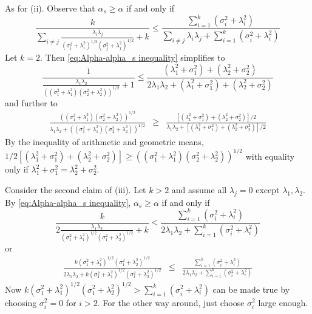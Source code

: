 \documentclass{article}
\makeatletter
\theoremstyle{plain}
\theoremstyle{plain}
\theoremstyle{definition}
\theoremstyle{remark}
\theoremstyle{definition}
\theoremstyle{plain}
\theoremstyle{plain}
\theoremstyle{definition}
\newenvironment{proof}[1][\protect\proofname]{\par
	\normalfont\topsep6\p@\@plus6\p@\relax
	\trivlist
	\itemindent\parindent
	\item[\hskip\labelsep\scshape #1]\ignorespaces
}{%
	\endtrivlist\@endpefalse
}
\providecommand{\proofname}{Proof}
\renewcommand{\sqrt}[1]{{(#1)^{1/2}}}
\makeatother
\begin{document}
\begin{proof}[Proof of Proposition \ref{prop:Reliabilities.}]
As for (ii). Observe that $\alpha_{s}\geq\alpha$
if and only if
\begin{equation}
\label{eq:Alpha-alpha_s inequality}
\frac{k}{\sum_{i\neq j}\frac{\lambda_{i}\lambda_{j}}{\sqrt{\sigma_{i}^{2}+\lambda_{i}^{2}}\sqrt{\sigma_{j}^{2}+\lambda_{j}^{2}}}+k}\leq\frac{\sum_{i=1}^{k}\left(\sigma_{i}^{2}+\lambda_{i}^{2}\right)}{\sum_{i\neq j}\lambda_{i}\lambda_{j}+\sum_{i=1}^{k}\left(\sigma_{i}^{2}+\lambda_{i}^{2}\right)}
\end{equation}
Let $k=2$. Then \eqref{eq:Alpha-alpha_s inequality} simplifies to
\[
\frac{1}{\frac{\lambda_{1}\lambda_{2}}{\sqrt{\left(\sigma_{1}^{2}+\lambda_{1}^{2}\right)\left(\sigma_{2}^{2}+\lambda_{2}^{2}\right)}}+1}\leq\frac{\left(\lambda_{1}^{2}+\sigma_{1}^{2}\right)+\left(\lambda_{2}^{2}+\sigma_{2}^{2}\right)}{2\lambda_{1}\lambda_{2}+\left(\lambda_{1}^{2}+\sigma_{1}^{2}\right)+\left(\lambda_{2}^{2}+\sigma_{2}^{2}\right)}
\]
and further to
\begin{eqnarray*}
\frac{\sqrt{\left(\sigma_{1}^{2}+\lambda_{1}^{2}\right)\left(\sigma_{2}^{2}+\lambda_{2}^{2}\right)}}{\lambda_{1}\lambda_{2}+\sqrt{\left(\sigma_{1}^{2}+\lambda_{1}^{2}\right)\left(\sigma_{2}^{2}+\lambda_{2}^{2}\right)}} & \geq & \frac{\left[\left(\lambda_{1}^{2}+\sigma_{1}^{2}\right)+\left(\lambda_{2}^{2}+\sigma_{2}^{2}\right)\right]/2}{\lambda_{1}\lambda_{2}+\left[\left(\lambda_{1}^{2}+\sigma_{1}^{2}\right)+\left(\lambda_{2}^{2}+\sigma_{2}^{2}\right)\right]/2}
\end{eqnarray*}
By the inequality of arithmetic and geometric means, $1/2\left[\left(\lambda_{1}^{2}+\sigma_{1}^{2}\right)+\left(\lambda_{2}^{2}+\sigma_{2}^{2}\right)\right]\geq\sqrt{\left(\sigma_{1}^{2}+\lambda_{1}^{2}\right)\left(\sigma_{2}^{2}+\lambda_{2}^{2}\right)}$
with equality only if $\lambda_{1}^{2}+\sigma_{1}^{2}=\lambda_{2}^{2}+\sigma_{2}^{2}$.

Consider the second claim of (iii). Let $k>2$ and assume all $\lambda_{j}=0$
except $\lambda_{1},\lambda_{2}$. By \eqref{eq:Alpha-alpha_s inequality}, $\alpha_s \geq \alpha$ if and
only if
\[
\frac{k}{2\frac{\lambda_{1}\lambda_{2}}{\sqrt{\sigma_{1}^{2}+\lambda_{1}^{2}}\sqrt{\sigma_{1}^{2}+\lambda_{2}^{2}}}+k}<\frac{\sum_{i=1}^{k}\left(\sigma_{i}^{2}+\lambda_{i}^{2}\right)}{2\lambda_{1}\lambda_{2}+\sum_{i=1}^{k}\left(\sigma_{i}^{2}+\lambda_{i}^{2}\right)}
\]
or
\begin{eqnarray*}
\frac{k\sqrt{\sigma_{1}^{2}+\lambda_{1}^{2}}\sqrt{\sigma_{1}^{2}+\lambda_{2}^{2}}}{2\lambda_{1}\lambda_{2}+k\sqrt{\sigma_{1}^{2}+\lambda_{1}^{2}}\sqrt{\sigma_{1}^{2}+\lambda_{2}^{2}}} & \leq & \frac{\sum_{i=1}^{k}\left(\sigma_{i}^{2}+\lambda_{i}^{2}\right)}{2\lambda_{1}\lambda_{2}+\sum_{i=1}^{k}\left(\sigma_{i}^{2}+\lambda_{i}^{2}\right)}
\end{eqnarray*}
Now $k\sqrt{\sigma_{1}^{2}+\lambda_{1}^{2}}\sqrt{\sigma_{1}^{2}+\lambda_{2}^{2}}>\sum_{i=1}^{k}\left(\sigma_{i}^{2}+\lambda_{i}^{2}\right)$
can be made true by choosing $\sigma_{i}^{2}=0$ for $i>2$. For the
other way around, just choose $\sigma_{i}^{2}$ large enough.


\end{proof}
\end{document}
